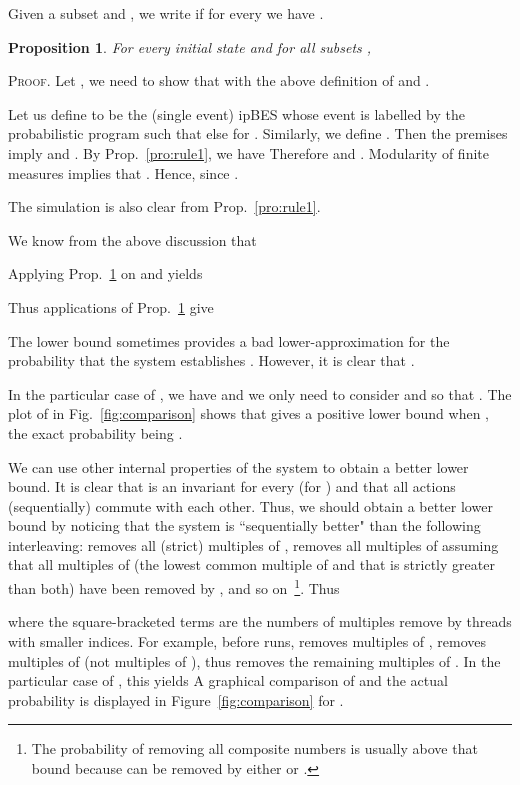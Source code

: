 \documentclass[review]{elsart}
\newtheorem{proposition}[definition]{Proposition}
\newenvironment{proof}{\par
\noindent
\textsc{Proof. }
\noindent}{\hfill}
\newcommand{\Prop}[1]{Prop.~\ref{#1}}
\newcommand{\Fig}[1]{Fig.~\ref{#1}}
\begin{document}
Given a subset  and , we write  if for every  we have . 

\begin{proposition}\label{p1605}
For every initial state  and for all subsets ,
\begin{footnotesize}

\end{footnotesize}
\end{proposition}

\begin{proof}
Let , we need to show that  with the above definition of  and . 
 
Let us define  to be the (single event) ipBES whose event is labelled by the probabilistic program  such that  else  for . Similarly, we define . Then the premises imply  and 
. By \Prop{pro:rule1}, we have 
Therefore  and . Modularity of finite measures implies that . Hence,  since .

The simulation  is also clear from \Prop{pro:rule1}.
\end{proof}

We know from the above discussion that 

Applying \Prop{p1605} on  and  yields

Thus  applications of \Prop{p1605} give 

The lower bound  sometimes provides a bad lower-approximation for the probability that the system establishes . However, it is clear that . 

In the particular case of , we have  and we only need to consider  and  so that . The plot of  in \Fig{fig:comparison} shows that  gives a positive lower bound when , the exact probability being . 


We can use other internal properties of the system to obtain a better lower bound. It is clear that  is an invariant for every  (for ) and that all actions  (sequentially) commute with each other. Thus, we should obtain a better lower bound by noticing that the system is ``sequentially better" than the following interleaving:  removes all (strict) multiples of ,  removes all multiples of  assuming that all multiples of  (the lowest common multiple of  and  that is strictly greater than both) have been removed by , and so on~\footnote{The probability of removing all composite numbers is  usually above that bound because  can be removed by either  or .}. Thus 

where the square-bracketed terms are the numbers of multiples remove by threads with smaller indices. For example, before  runs,  removes  multiples of ,  removes  multiples of  (not multiples of ), thus  removes the remaining  multiples of . In the particular case of , this yields
 A graphical comparison of  and the actual probability is displayed in Figure~\ref{fig:comparison} for .
\end{document}
